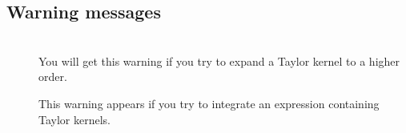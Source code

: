 \subsection{Warning messages}
\begin{description}

\item[]\mbox{}\\
    You will get this warning if you try to expand a Taylor kernel to
    a higher order.

\item[\hspace*{-2mm}]%
    This warning appears if you try to integrate an expression
    containing Taylor kernels.

\end{description}

